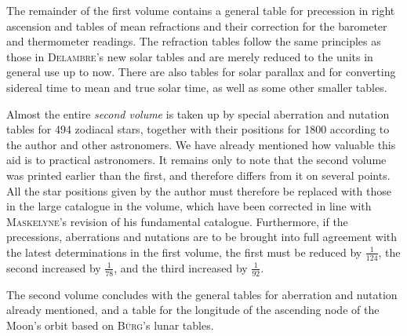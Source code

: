 The remainder of the first volume contains a general table for precession in right ascension and tables of mean refractions and their correction for the barometer and thermometer readings. The refraction tables follow the same principles as those in \textsc{Delambre}’s new solar tables and are merely reduced to the units in general use up to now. There are also tables for solar parallax and for converting sidereal time to mean and true solar time, as well as some other smaller tables.

Almost the entire \emph{second volume} is taken up by special aberration and nutation tables for 494 zodiacal stars, together with their positions for 1800 according to the author and other astronomers. We have already mentioned how valuable this aid is to practical astronomers. It remains only to note that the second volume was printed earlier than the first, and therefore differs from it on several points. All the star positions given by the author must therefore be replaced with those in the large catalogue in the volume, which have been corrected in line with \textsc{Maskelyne}’s revision of his fundamental catalogue. Furthermore, if the precessions, aberrations and nutations are to be brought into full agreement with the latest determinations in the first volume, the first must be reduced by $\frac{1}{124}$, the second increased by $\frac{1}{78}$, and the third increased by $\frac{1}{92}$.

The second volume concludes with the general tables for aberration and nutation already mentioned, and a table for the longitude of the ascending node of the Moon’s orbit based on \textsc{Bürg}’s lunar tables.

